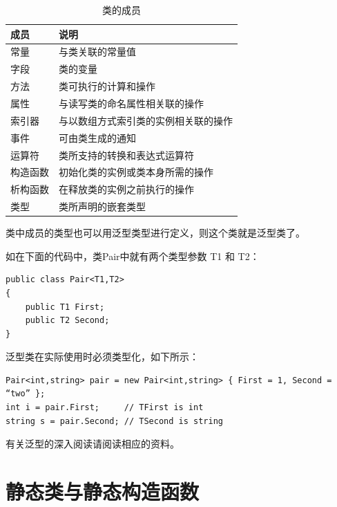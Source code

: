 \begin{table}[htbp]
    \centering
    \caption{类的成员}
    \label{tab:classcontentitems}
    \begin{tabular}{ll}
        \hline
        成员   & 说明                 \\
        \hline
        常量   & 与类关联的常量值           \\
        字段   & 类的变量               \\
        方法   & 类可执行的计算和操作         \\
        属性   & 与读写类的命名属性相关联的操作    \\
        索引器  & 与以数组方式索引类的实例相关联的操作 \\
        事件   & 可由类生成的通知           \\
        运算符  & 类所支持的转换和表达式运算符     \\
        构造函数 & 初始化类的实例或类本身所需的操作   \\
        析构函数 & 在释放类的实例之前执行的操作     \\
        类型   & 类所声明的嵌套类型          \\
        \hline
    \end{tabular}
\end{table}

类中成员的类型也可以用泛型类型进行定义，则这个类就是泛型类了。

如在下面的代码中，类Pair中就有两个类型参数 T1 和 T2：

\begin{lstlisting}
public class Pair<T1,T2>
{
    public T1 First;
    public T2 Second;
}
\end{lstlisting}

泛型类在实际使用时必须类型化，如下所示：

\begin{lstlisting}
Pair<int,string> pair = new Pair<int,string> { First = 1, Second = “two” };
int i = pair.First;     // TFirst is int
string s = pair.Second; // TSecond is string
\end{lstlisting}

有关泛型的深入阅读请阅读相应的资料。


\section{静态类与静态构造函数}

